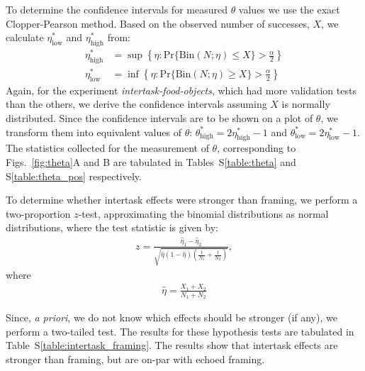 \documentclass{sigchi}
\begin{document}
To determine the confidence intervals for measured $\theta$ values we 
use the exact Clopper-Pearson method. %
Based on the observed number of successes, $X$, we calculate 
$\eta^*_\mathrm{low}$ and $\eta^*_\mathrm{high}$ from:
\begin{align}
	\eta^*_\mathrm{high} &= \sup
		\left\{
			\eta : \mathrm{Pr}\{\mathrm{Bin}(N; \eta) \leq X \} > 
				\frac{\alpha}{2}
		\right\} \\
	\eta^*_\mathrm{low} &= \inf
		\left\{
			\eta : \mathrm{Pr}\{\mathrm{Bin}(N; \eta) \geq X \} > 
				\frac{\alpha}{2}
		\right\}
\end{align}
Again, for the experiment \textit{intertask-food-objects}, which had 
more validation tests than the others, we derive the confidence intervals
assuming $X$ is normally distributed.
Since the confidence intervals are to be shown on a plot of $\theta$, we 
transform them into equivalent values of 
$\theta$: $\theta^*_\mathrm{high} = 2\eta^*_\mathrm{high} - 1$ and 
$\theta^*_\mathrm{low} = 2\eta^*_\mathrm{low} - 1$.
The statistics collected for the measurement of $\theta$, corresponding to
Figs.~\ref{fig:theta}A and B are tabulated in Tables~S\ref{table:theta} and
S\ref{table:theta_pos} respectively.

To determine whether intertask effects were stronger than framing, we 
perform a two-proportion $z$-test, approximating the binomial distributions
as normal distributions, where the test statistic is given by:
\begin{align}
	z = \frac{\hat{\eta}_1 - \hat{\eta}_2}
		{\sqrt{
			\hat{\eta} (1 - \hat{\eta}) 
			\left( \frac{1}{N_1} + \frac{1}{N_2}\right)
		}},
\end{align}
where
\begin{align}
	\hat{\eta} = \frac{X_1 + X_2}{N_1 + N_2}
\end{align}


Since, \textit{a priori}, we do not know which effects
should be stronger (if any), we perform a two-tailed test.  The results for 
these hypothesis tests are tabulated in Table~S\ref{table:intertask_framing}.
The results show that intertask effects are stronger than framing, but are
on-par with echoed framing.
\end{document}
